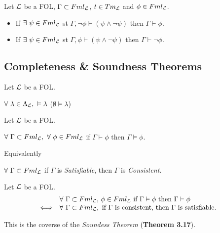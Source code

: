 \documentclass[11pt,a4paper]{article}
\begin{document}
\proposition{}
Let $\mathcal{L}$ be a FOL, $\Gamma\subset Fml_{\mathcal{L}}$, $t\in Tm_{\mathcal{L}}$ and $\phi\in Fml_{\mathcal{L}}$.
\begin{itemize}
	\item If $\exists\ \psi\in Fml_{\mathcal{L}}$ st $\Gamma,\neg\phi\vdash(\psi\wedge\neg\psi)$ then $\Gamma\vdash\phi$.
	\item If $\exists\ \psi\in Fml_{\mathcal{L}}$ st $\Gamma,\phi\vdash(\psi\wedge\neg\psi)$ then $\Gamma\vdash\neg\phi$.
\end{itemize}








\subsection{Completeness \& Soundness Theorems}

Let $\mathcal{L}$ be a FOL.
\begin{center}$\forall\ \lambda\in\Lambda_{\mathcal{L}},\ \vDash \lambda$ (\ie $\emptyset\vDash\lambda$)\end{center}

Let $\mathcal{L}$ be a FOL.
\begin{center}$\forall\ \Gamma\subset Fml_\LL,\ \forall\ \phi\in Fml_\LL$ if $\Gamma\vdash\phi$ then $\Gamma\vDash\phi$.\end{center}
Equivalently
\begin{center}$\forall\ \Gamma\subset Fml_{\mathcal{L}}$ if $\Gamma$ is \textit{Satisfiable}, then $\Gamma$ is \textit{Consistent}.\end{center}

Let $\mathcal{L}$ be a FOL.
\[\begin{array}{rl}
&\forall\ \Gamma\subset Fml_{\mathcal{L}}\text,\ \phi\in Fml_{\mathcal{L}}\text{ if }\Gamma\vDash\phi\text{ then }\Gamma\vdash\phi\\
\Longleftrightarrow&\forall\ \Gamma\subset Fml_{\mathcal{L}},\text{ if }\Gamma\text{ is consistent, then }\Gamma\text{ is satisfiable}.
\end{array}\]
\begin{center}
\end{center}
This is the coverse of the \textit{Soundess Theorem} (\textbf{Theorem 3.17}).\\
\end{document}
